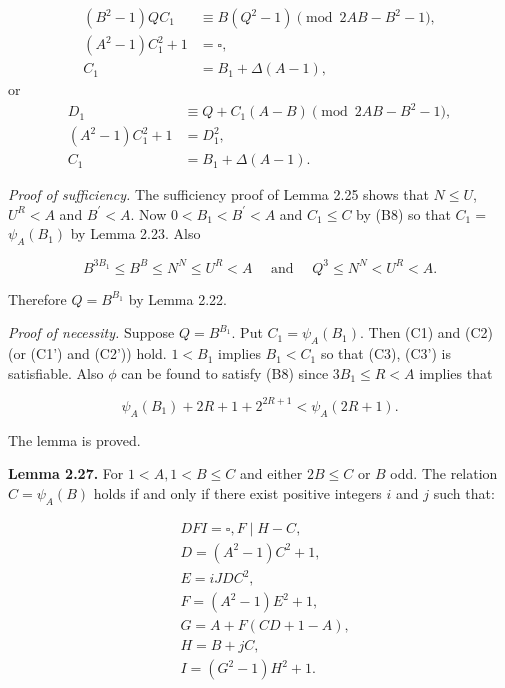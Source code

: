 \documentclass[11pt,a4paper]{article}
\begin{document}
\begin{align*}
 (B^{2}-1)QC_1&\equiv B(Q^{2}-1)\pmod{2AB-B^{2}-1},\tag{C1}\\
 (A^{2}-1)C_1^{2}+1&=\square,\tag{C2}\\
 C_1&=B_1+\Delta(A-1),\tag{C3}
\end{align*}
or
\begin{align*}
 D_1&\equiv Q+C_1(A-B)\pmod{2AB-B^{2}-1},\tag{C1'}\\
 (A^{2}-1)C_1^{2}+1&=D_1^{2},\tag{C2'}\\
 C_1&=B_1+\Delta(A-1).\tag{C3'}
\end{align*}

\noindent\emph{Proof of sufficiency.} The sufficiency proof of Lemma 2.25 shows that $N \leq U$, $U^{R}<A$ and $B^{\prime}<A$. Now $0<B_{1}<B^{\prime}<A$ and $C_{1} \leq C$ by (B8) so that $C_{1}=$ $\psi_{A}\left(B_{1}\right)$ by Lemma 2.23. Also


\begin{equation*}
B^{3 B_{1}} \leq B^{B} \leq N^{N} \leq U^{R}<A \quad \text { and } \quad Q^{3} \leq N^{N}<U^{R}<A . \tag{13}
\end{equation*}


Therefore $Q=B^{B_{1}}$ by Lemma 2.22.

\noindent\emph{Proof of necessity.} Suppose $Q=B^{B_{1}}$. Put $C_{1}=\psi_{A}\left(B_{1}\right)$. Then (C1) and (C2) (or (C1') and (C2')) hold. $1<B_{1}$ implies $B_{1}<C_{1}$ so that (C3), (C3') is satisfiable. Also $\phi$ can be found to satisfy (B8) since $3 B_{1} \leq R<A$ implies that


\begin{equation*}
\psi_{A}\left(B_{1}\right)+2 R+1+2^{2 R+1}<\psi_{A}(2 R+1) . \tag{14}
\end{equation*}


The lemma is proved.

\noindent\textbf{Lemma 2.27.} For $1<A,\allowbreak  1<B \leq C$ and either $2 B \leq C$ or $B$ odd. The relation $C=\psi_{A}(B)$ holds if and only if there exist positive integers $i$ and $j$ such that:


\begin{align*}
& D F I=\square, F \mid H-C,  \tag{A1}\\
& D=\left(A^{2}-1\right) C^{2}+1,  \tag{A2}\\
& E=i J D C^{2},  \tag{A3}\\
& F=\left(A^{2}-1\right) E^{2}+1,  \tag{A4}\\
& G=A+F(C D+1-A),  \tag{A5}\\
& H=B+j C,  \tag{A6}\\
& I=\left(G^{2}-1\right) H^{2}+1 . \tag{A7}
\end{align*}
\end{document}
